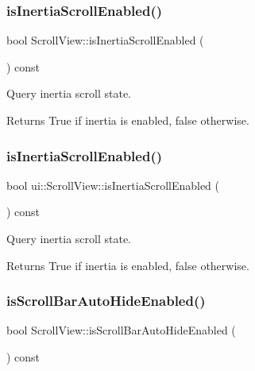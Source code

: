 \subsubsection{\texorpdfstring{is\+Inertia\+Scroll\+Enabled()}{isInertiaScrollEnabled()}\hspace{0.1cm}{\footnotesize\ttfamily [1/2]}}
{\footnotesize\ttfamily bool Scroll\+View\+::is\+Inertia\+Scroll\+Enabled (\begin{DoxyParamCaption}{ }\end{DoxyParamCaption}) const}



Query inertia scroll state. 

\begin{DoxyReturn}{Returns}
True if inertia is enabled, false otherwise. 
\end{DoxyReturn}
\mbox{\label{classui_1_1ScrollView_a19f430a483ad7960e65f8916bee82c24}} 
\subsubsection{\texorpdfstring{is\+Inertia\+Scroll\+Enabled()}{isInertiaScrollEnabled()}\hspace{0.1cm}{\footnotesize\ttfamily [2/2]}}
{\footnotesize\ttfamily bool ui\+::\+Scroll\+View\+::is\+Inertia\+Scroll\+Enabled (\begin{DoxyParamCaption}{ }\end{DoxyParamCaption}) const}



Query inertia scroll state. 

\begin{DoxyReturn}{Returns}
True if inertia is enabled, false otherwise. 
\end{DoxyReturn}
\mbox{\label{classui_1_1ScrollView_a831fcfa013f9adf78215d5ee1e2077ae}} 
\subsubsection{\texorpdfstring{is\+Scroll\+Bar\+Auto\+Hide\+Enabled()}{isScrollBarAutoHideEnabled()}\hspace{0.1cm}{\footnotesize\ttfamily [1/2]}}
{\footnotesize\ttfamily bool Scroll\+View\+::is\+Scroll\+Bar\+Auto\+Hide\+Enabled (\begin{DoxyParamCaption}{ }\end{DoxyParamCaption}) const}



